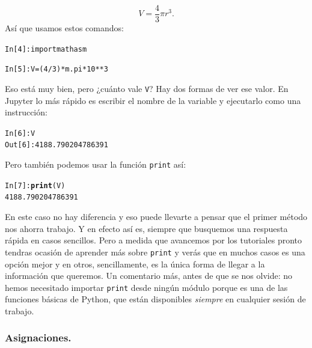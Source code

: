 \documentclass[10pt,a4paper]{article}\usepackage[]{graphicx}\usepackage[]{color}
\makeatletter
\newcommand{\hlnum}[1]{\textcolor[rgb]{0.686,0.059,0.569}{#1}}%
\newcommand{\hlopt}[1]{\textcolor[rgb]{0,0,0}{#1}}%
\newcommand{\hlstd}[1]{\textcolor[rgb]{0.345,0.345,0.345}{#1}}%
\newcommand{\hlkwd}[1]{\textcolor[rgb]{0.737,0.353,0.396}{\textbf{#1}}}%
\newenvironment{kframe}{%
 \def\at@end@of@kframe{}%
 \ifinner\ifhmode%
  \def\at@end@of@kframe{\end{minipage}}%
  \begin{minipage}{\columnwidth}%
 \fi\fi%
 \def\FrameCommand##1{\hskip\@totalleftmargin \hskip-\fboxsep
 \colorbox{shadecolor}{##1}\hskip-\fboxsep
     \hskip-\linewidth \hskip-\@totalleftmargin \hskip\columnwidth}%
 \MakeFramed {\advance\hsize-\width
   \@totalleftmargin\z@ \linewidth\hsize
   \@setminipage}}%
 {\par\unskip\endMakeFramed%
 \at@end@of@kframe}
\newenvironment{knitrout}{}{} %
\makeatother
\begin{document}
\[V = \dfrac{4}{3}\pi r^3.\]
Así que usamos estos comandos:
\begin{knitrout}
\color{fgcolor}\begin{kframe}
\begin{alltt}
In [4]: import math as m

In [5]: V = (4 / 3) * m.pi * 10**3
\end{alltt}
\end{kframe}
\end{knitrout}
Eso está muy bien, pero ¿cuánto vale {\tt V}? Hay dos formas de ver ese valor. En Jupyter lo más rápido es escribir el nombre de la variable y ejecutarlo como una instrucción:
\begin{knitrout}
\color{fgcolor}\begin{kframe}
\begin{alltt}
\hlstd{In [}\hlnum{6}\hlstd{]}\hlopt{:} \hlstd{V}
\hlstd{Out[}\hlnum{6}\hlstd{]}\hlopt{:} \hlnum{4188.790204786391}
\end{alltt}
\end{kframe}
\end{knitrout}
Pero también podemos usar la función {\tt print} así:
\begin{knitrout}
\color{fgcolor}\begin{kframe}
\begin{alltt}
\hlstd{In [}\hlnum{7}\hlstd{]}\hlopt{:} \hlkwd{print}\hlstd{(V)}
\hlnum{4188.790204786391}
\end{alltt}
\end{kframe}
\end{knitrout}
En este caso no hay diferencia y eso puede llevarte a pensar que el primer método nos ahorra trabajo. Y en efecto así es, siempre que busquemos una respuesta rápida en casos sencillos. Pero a medida que avancemos por los tutoriales pronto tendras ocasión de aprender más sobre {\tt print} y verás que en muchos casos es una opción mejor y en otros, sencillamente, es la única forma de llegar a la información que queremos. Un comentario más, antes de que se nos olvide: no hemos necesitado importar {\tt print} desde ningún  módulo porque es una de las funciones básicas de Python, que están disponibles {\em siempre} en cualquier sesión de trabajo.

\subsubsection*{Asignaciones.}
\label{tut02:subsubsec:asignaciones}
\end{document}

